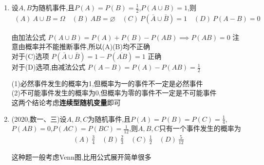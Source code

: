 \documentclass[12pt, a4paper, oneside, UTF8]{ctexbook}
\begin{document}
\begin{enumerate}[label=\arabic*.]
    \item 设$A,B$为随机事件,且$P(A)=P(B)=\frac{1}{2}$,$P(A\cup B)=1$,则
    \begin{align*}
        (A)\ A\cup B=\Omega \quad (B)\ AB=\varnothing \quad (C)\ P(\bar{A}\cup\bar{B})=1 \quad (D)\ P(A-B)=0
    \end{align*}

    \begin{solution}
    由加法公式
    $P(A\cup B) = P(A) + P(B) - P(AB)\implies P(AB) = 0$ 
    \newline
    注意由概率并不能推断事件,所以(A)(B)均不正确 \\
    对于(C)选项 $P(\bar{A}\cup\bar{B}) = 1 - P(\overline{AB}) = 1$ 正确 \\
    对于(D)选项,由减法公式 $P(A-B) = P(A) - P(AB) = \frac{1}{2}$
    \end{solution}
    
    \begin{tcolorbox}[title=总结]
        (1)必然事件发生的概率为1,但概率为一的事件不一定是必然事件  \\
        (2)不可能事件发生的概率为0,但概率为零的事件不一定是不可能事件 \\
        这两个结论考虑\textbf{连续型随机变量}即可
    \end{tcolorbox}

    \item (2020,数一、三)设$A,B,C$为随机事件,且$P(A)=P(B)=P(C)=\frac{1}{4}$,$P(AB)=0$,$P(AC)=P(BC)=\frac{1}{12}$,则$A,B,C$只有一个事件发生的概率为
    \begin{align*}
        (A)\ \frac{3}{4} \quad (B)\ \frac{2}{3} \quad (C)\ \frac{1}{2} \quad (D)\ \frac{5}{12}
    \end{align*}
    \begin{solution}
    这种题一般考虑Venn图,比用公式展开简单很多
    \begin{center}
\end{center}
\end{solution}
\end{enumerate}
\end{document}
